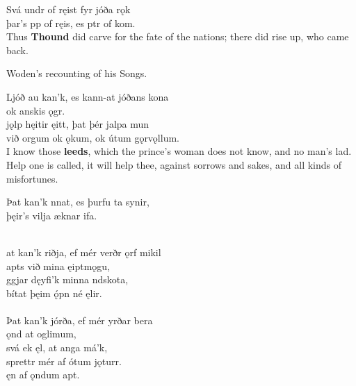 \bva Svá undr of ręist \hld fyr jóða rǫk \\%
þar's pp of ręis, \hld es ptr of kom.\\%

\bvb Thus \textbf{Thound} did carve for the fate of the nations; there did rise up, who came back.\footnotemark[8] \\


	Woden's recounting of his Songs.

\bva Ljóð au kan'k, \hld es kann-at jóðans kona \\%
\ind ok anskis ǫgr. \\%
jǫlp hęitir ęitt, \hld þat þér jalpa mun \\%
\ind við orgum ok ǫkum, \hld ok útum gǫrvǫllum.\\%

\bvb I know those \textbf{leeds}, which the prince's woman does not know, and no man's lad. Help one is called, it will help thee, against sorrows and sakes\footnotemark[9], and all kinds of misfortunes. \\

\bva Þat kan'k nnat, \hld es þurfu ta synir,\footnotemark[10] \\%
\ind þęir's vilja æknar ifa.\\%

 \\

\bva {}at kan'k riðja, \hld ef mér verðr ǫrf mikil \\%
\ind {}apts við mina ęiptmǫgu, \\%
ggjar dęyfi'k \hld minna ndskota, \\%
\ind bítat þęim ǫ́pn né ęlir.\\%

 \\

\bva Þat kan'k jórða, \hld ef mér yrðar bera \\%
\ind {}ǫnd at oglimum, \\%
svá ek ęl, \hld at anga má'k, \\%
\ind sprettr mér af ótum jǫturr. \\%
\ind ęn af ǫndum apt.\\%

